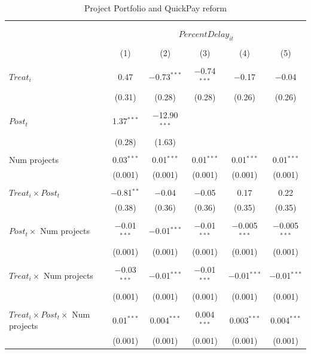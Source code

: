 \documentclass[
]{article}
\begin{document}
\begin{table}[H] \centering 
  \caption{Project Portfolio and QuickPay reform} 
  \label{} 
\small 
\begin{tabular}{@{\extracolsep{-2pt}}lccccc} 
\\[-1.8ex]\hline 
\hline \\[-1.8ex] 
\\[-1.8ex] & \multicolumn{5}{c}{$PercentDelay_{it}$  } \\ 
\\[-1.8ex] & (1) & (2) & (3) & (4) & (5)\\ 
\hline \\[-1.8ex] 
 $Treat_i$ & 0.47 & $-$0.73$^{***}$ & $-$0.74$^{***}$ & $-$0.17 & $-$0.04 \\ 
  & (0.31) & (0.28) & (0.28) & (0.26) & (0.26) \\ 
  & & & & & \\ 
 $Post_t$ & 1.37$^{***}$ & $-$12.90$^{***}$ &  &  &  \\ 
  & (0.28) & (1.63) &  &  &  \\ 
  & & & & & \\ 
 Num projects & 0.03$^{***}$ & 0.01$^{***}$ & 0.01$^{***}$ & 0.01$^{***}$ & 0.01$^{***}$ \\ 
  & (0.001) & (0.001) & (0.001) & (0.001) & (0.001) \\ 
  & & & & & \\ 
 $Treat_i \times Post_t$ & $-$0.81$^{**}$ & $-$0.04 & $-$0.05 & 0.17 & 0.22 \\ 
  & (0.38) & (0.36) & (0.36) & (0.35) & (0.35) \\ 
  & & & & & \\ 
 $Post_t \times$ Num projects & $-$0.01$^{***}$ & $-$0.01$^{***}$ & $-$0.01$^{***}$ & $-$0.005$^{***}$ & $-$0.005$^{***}$ \\ 
  & (0.001) & (0.001) & (0.001) & (0.001) & (0.001) \\ 
  & & & & & \\ 
 $Treat_i \times$ Num projects & $-$0.03$^{***}$ & $-$0.01$^{***}$ & $-$0.01$^{***}$ & $-$0.01$^{***}$ & $-$0.01$^{***}$ \\ 
  & (0.001) & (0.001) & (0.001) & (0.001) & (0.001) \\ 
  & & & & & \\ 
 $Treat_i \times Post_t \times$ Num projects & 0.01$^{***}$ & 0.004$^{***}$ & 0.004$^{***}$ & 0.003$^{***}$ & 0.004$^{***}$ \\ 
  & (0.001) & (0.001) & (0.001) & (0.001) & (0.001) \\ 

\end{tabular}
\end{table}
\end{document}
